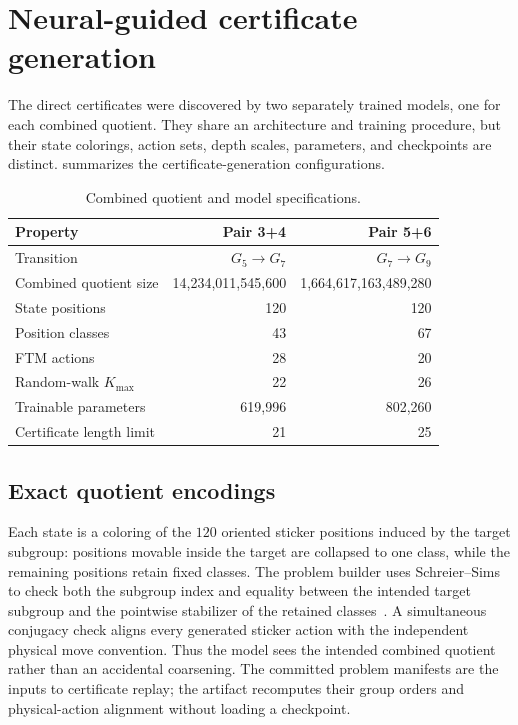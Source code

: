 \section{Neural-guided certificate generation}
\label{sec:neural-search}

The direct certificates were discovered by two separately trained models, one
for each combined quotient.  They share an architecture and training
procedure, but their state colorings, action sets, depth scales, parameters,
and checkpoints are distinct.   summarizes the
certificate-generation configurations.

\begin{table}[t]
\centering
\caption{Combined quotient and model specifications.}
\label{tab:model-specifications}
\small
\begin{tabular}{@{}lrr@{}}
\toprule
Property & Pair 3+4 & Pair 5+6\\
\midrule
Transition & $G_5\to G_7$ & $G_7\to G_9$\\
Combined quotient size & 14,234,011,545,600 & 1,664,617,163,489,280\\
State positions & 120 & 120\\
Position classes & 43 & 67\\
FTM actions & 28 & 20\\
Random-walk $K_{\max}$ & 22 & 26\\
Trainable parameters & 619,996 & 802,260\\
Certificate length limit & 21 & 25\\
\bottomrule
\end{tabular}
\end{table}

\subsection{Exact quotient encodings}

Each state is a coloring of the $120$ oriented sticker positions induced by
the target subgroup: positions movable inside the target are collapsed to one
class, while the remaining positions retain fixed classes.  The problem
builder uses Schreier--Sims to check both the subgroup index and equality
between the intended target subgroup and the pointwise stabilizer of the
retained classes~\cite{seress2003}.  A simultaneous conjugacy check aligns every generated
sticker action with the independent physical move convention.  Thus the model
sees the intended combined quotient rather than an accidental coarsening.
The committed problem manifests are the inputs to certificate replay; the
artifact recomputes their group orders and physical-action alignment without
loading a checkpoint.

